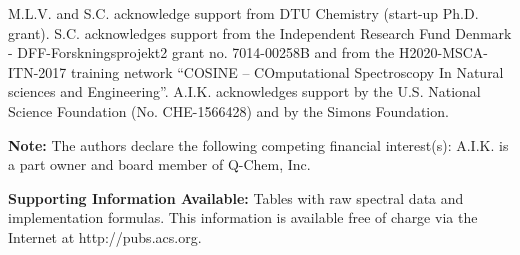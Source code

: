 \documentclass[journal=jctcce,manuscript=article]{achemso}
\begin{document}
\begin{acknowledgement}
M.L.V. and S.C. acknowledge support from DTU Chemistry (start-up Ph.D. grant). S.C. acknowledges support from the Independent Research Fund Denmark - DFF-Forskningsprojekt2 grant no. 7014-00258B and from the H2020-MSCA-ITN-2017 training network ``COSINE -- COmputational Spectroscopy In Natural sciences and Engineering''.
A.I.K.  acknowledges support by  the U.S.  National Science Foundation
(No.  CHE-1566428) and by the Simons Foundation. 

{\bf Note:} The authors declare the following competing financial
interest(s): A.I.K. is a part owner and board member of Q-Chem, Inc.
\end{acknowledgement}


\textbf{Supporting Information Available:}
Tables with raw spectral data and implementation formulas.
This information is available free of charge via the Internet at http://pubs.acs.org.

%
  




\end{document}
